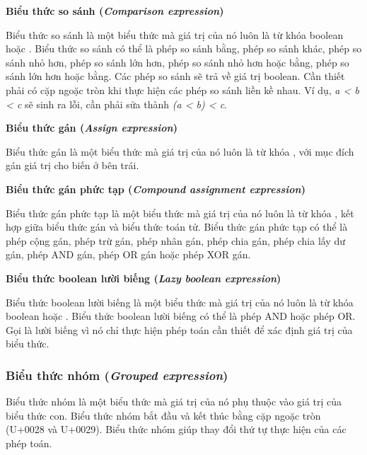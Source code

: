\noindent\textbf{Biểu thức so sánh (\textit{Comparison expression})}

\regexcompexpr

Biểu thức so sánh là một biểu thức mà giá trị của nó luôn là từ khóa boolean  hoặc . Biểu thức so sánh có thể là phép so sánh bằng, phép so sánh khác, phép so sánh nhỏ hơn, phép so sánh lớn hơn, phép so sánh nhỏ hơn hoặc bằng, phép so sánh lớn hơn hoặc bằng. Các phép so sánh sẽ trả về giá trị boolean. Cần thiết phải có cặp ngoặc tròn khi thực hiện các phép so sánh liền kề nhau. Ví dụ, \textit{a < b < c} sẽ sinh ra lỗi, cần phải sửa thành \textit{(a < b) < c}.

\noindent\textbf{Biểu thức gán (\textit{Assign expression})}

\regexassignexpr

Biểu thức gán là một biểu thức mà giá trị của nó luôn là từ khóa , với mục đích gán giá trị cho biến ở bên trái.

\noindent\textbf{Biểu thức gán phức tạp (\textit{Compound assignment expression})}

\regexcompoundassignexpr

Biểu thức gán phức tạp là một biểu thức mà giá trị của nó luôn là từ khóa , kết hợp giữa biểu thức gán và biểu thức toán tử. Biểu thức gán phức tạp có thể là phép cộng gán, phép trừ gán, phép nhân gán, phép chia gán, phép chia lấy dư gán, phép AND gán, phép OR gán hoặc phép XOR gán.

\noindent\textbf{Biểu thức boolean lười biếng (\textit{Lazy boolean expression})}

\regexlazyboolexpr

Biểu thức boolean lười biếng là một biểu thức mà giá trị của nó luôn là từ khóa boolean  hoặc . Biểu thức boolean lười biếng có thể là phép AND hoặc phép OR. Gọi là lười biếng vì nó chỉ thực hiện phép toán cần thiết để xác định giá trị của biểu thức.

\subsubsection{Biểu thức nhóm (\textit{Grouped expression})}

\regexgroupexpr

Biểu thức nhóm là một biểu thức mà giá trị của nó phụ thuộc vào giá trị của biểu thức con. Biểu thức nhóm bắt đầu và kết thúc bằng cặp ngoặc tròn (U+0028 và U+0029). Biểu thức nhóm giúp thay đổi thứ tự thực hiện của các phép toán.

